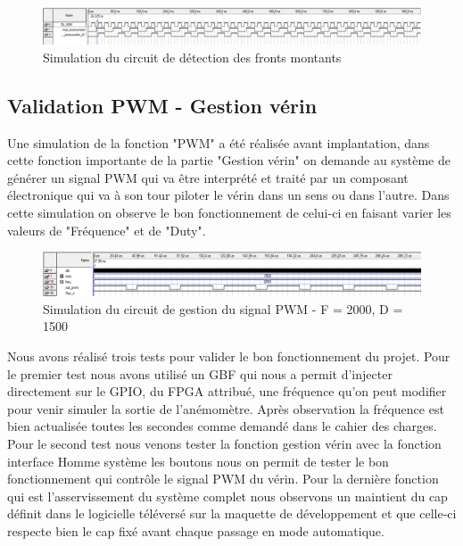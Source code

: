 \begin{figure}[h]
  \begin{center}
    \includegraphics[width=\textwidth]{images/Detecteur_Fronts_montants.jpg}
    \caption{Simulation du circuit de détection des fronts montants}
  \end{center}
\end{figure}

\newpage 

\subsection{Validation PWM - Gestion vérin}

Une simulation de la fonction "PWM" a été réalisée avant implantation, dans cette fonction importante de la partie "Gestion vérin" on demande au système de générer un signal PWM qui va être interprété et traité par un composant électronique qui va à son tour piloter le vérin dans un sens ou dans l'autre. Dans cette simulation on observe le bon fonctionnement de celui-ci en faisant varier les valeurs de "Fréquence" et de "Duty".

\begin{figure}[h]
  \begin{center}
    \includegraphics[width=\textwidth]{images/pwm.png}
    \caption{Simulation du circuit de gestion du signal PWM - F = 2000, D = 1500}
  \end{center}
\end{figure}

Nous avons réalisé trois tests pour valider le bon fonctionnement du projet. Pour le premier test nous avons utilisé un GBF qui nous a permit d'injecter directement sur le GPIO, du FPGA attribué, une fréquence qu'on peut modifier pour venir simuler la sortie de l'anémomètre. Après observation la fréquence est bien actualisée toutes les secondes comme demandé dans le cahier des charges. Pour le second test nous venons tester la fonction gestion vérin avec la fonction interface Homme système les boutons nous on permit de tester le bon fonctionnement qui contrôle le signal PWM du vérin. Pour la dernière fonction qui est l'asservissement du système complet nous observons un maintient du cap définit dans le logicielle téléversé sur la maquette de développement et que celle-ci respecte bien le cap fixé avant chaque passage en mode automatique.\newline

